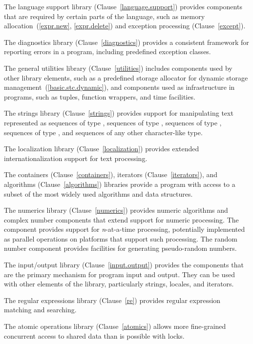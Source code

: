 \pnum
The language support library (Clause~\ref{language.support}) provides components that are
required by certain parts of the \Cpp language, such as memory allocation~(\ref{expr.new},
\ref{expr.delete}) and exception processing (Clause~\ref{except}).

\pnum
The diagnostics library (Clause~\ref{diagnostics}) provides a consistent framework for
reporting errors in a \Cpp program, including predefined exception classes.

\pnum
The general utilities library (Clause~\ref{utilities}) includes components used
by other library elements, such as a predefined storage allocator for dynamic
storage management~(\ref{basic.stc.dynamic}), and components used
as infrastructure
in \Cpp programs,
such as tuples, function wrappers, and time facilities.

\pnum
The strings library (Clause~\ref{strings}) provides support for manipulating text represented 
as sequences of type
,
sequences of type
,
sequences of type
,
sequences of type
,
and sequences of any other character-like type.

\pnum
The localization library (Clause~\ref{localization}) provides extended internationalization
support for text processing.

\pnum
The containers (Clause~\ref{containers}), iterators (Clause~\ref{iterators}),
and algorithms (Clause~\ref{algorithms}) libraries provide a \Cpp program with access
to a subset of the most widely used algorithms and data structures.

\pnum
The numerics library (Clause~\ref{numerics}) provides
numeric algorithms and complex number components that extend support for numeric processing.
The
component provides support for
\textit{n}-at-a-time
processing,
potentially implemented as parallel operations on platforms that support such processing.
The random number component provides facilities for generating pseudo-random numbers.

\pnum
The input/output library (Clause~\ref{input.output}) provides the
components that are the primary mechanism for \Cpp program input and output.
They can be used with other elements of the library, particularly
strings, locales, and iterators.

\pnum
The regular expressions library (Clause~\ref{re}) provides regular expression matching and searching.

\pnum
The atomic operations library (Clause~\ref{atomics}) allows more fine-grained
concurrent access to shared data than is possible with locks.

